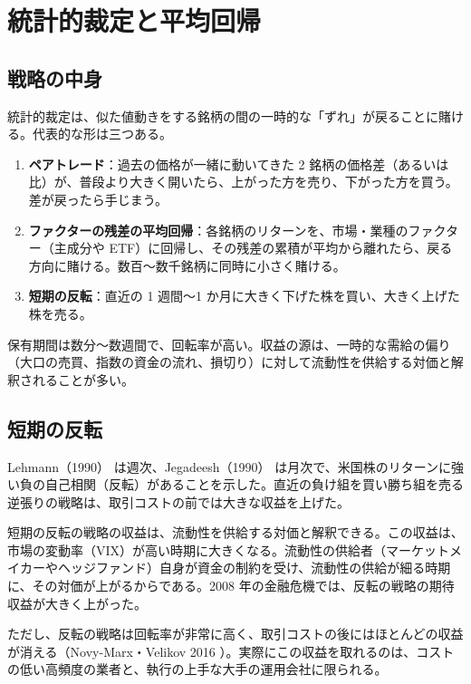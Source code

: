 \chapter{統計的裁定と平均回帰}
\label{ch:statarb}

\section{戦略の中身}

統計的裁定は、似た値動きをする銘柄の間の一時的な「ずれ」が戻ることに賭ける。代表的な形は三つある。

\begin{enumerate}
\item \textbf{ペアトレード}：過去の価格が一緒に動いてきた 2 銘柄の価格差（あるいは比）が、普段より大きく開いたら、上がった方を売り、下がった方を買う。差が戻ったら手じまう。
\item \textbf{ファクターの残差の平均回帰}：各銘柄のリターンを、市場・業種のファクター（主成分や ETF）に回帰し、その残差の累積が平均から離れたら、戻る方向に賭ける。数百〜数千銘柄に同時に小さく賭ける。
\item \textbf{短期の反転}：直近の 1 週間〜1 か月に大きく下げた株を買い、大きく上げた株を売る。
\end{enumerate}

保有期間は数分〜数週間で、回転率が高い。収益の源は、一時的な需給の偏り（大口の売買、指数の資金の流れ、損切り）に対して流動性を供給する対価と解釈されることが多い。

\section{短期の反転}

Lehmann（1990）\cite{lehmann1990} は週次、Jegadeesh（1990）\cite{jegadeesh1990} は月次で、米国株のリターンに強い負の自己相関（反転）があることを示した。直近の負け組を買い勝ち組を売る逆張りの戦略は、取引コストの前では大きな収益を上げた。

\begin{paperbox}
短期の反転の戦略の収益は、流動性を供給する対価と解釈できる。この収益は、市場の変動率（VIX）が高い時期に大きくなる。流動性の供給者（マーケットメイカーやヘッジファンド）自身が資金の制約を受け、流動性の供給が細る時期に、その対価が上がるからである。2008 年の金融危機では、反転の戦略の期待収益が大きく上がった。
\end{paperbox}

ただし、反転の戦略は回転率が非常に高く、取引コストの後にはほとんどの収益が消える（Novy-Marx・Velikov 2016 \cite{novymarxvelikov2016}）。実際にこの収益を取れるのは、コストの低い高頻度の業者と、執行の上手な大手の運用会社に限られる。


